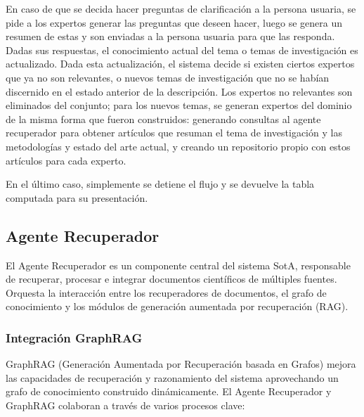 \documentclass[12pt]{article}
\begin{document}
En caso de que se decida hacer preguntas de clarificación a la persona usuaria, se pide a los expertos generar las preguntas que deseen hacer, luego se genera un resumen de estas y son enviadas a la persona usuaria para que las responda. Dadas sus respuestas, el conocimiento actual del tema o temas de investigación es actualizado. Dada esta actualización, el sistema decide si existen ciertos expertos que ya no son relevantes, o nuevos temas de investigación que no se habían discernido en el estado anterior de la descripción. Los expertos no relevantes son eliminados del conjunto; para los nuevos temas, se generan expertos del dominio de la misma forma que fueron construidos: generando consultas al agente recuperador para obtener artículos que resuman el tema de investigación y las metodologías y estado del arte actual, y creando un repositorio propio con estos artículos para cada experto.

En el último caso, simplemente se detiene el flujo y se devuelve la tabla computada para su presentación.

\subsection{Agente Recuperador}
El Agente Recuperador es un componente central del sistema SotA, responsable de recuperar, procesar e integrar documentos científicos de múltiples fuentes. Orquesta la interacción entre los recuperadores de documentos, el grafo de conocimiento y los módulos de generación aumentada por recuperación (RAG).

\subsubsection{Integración GraphRAG}
GraphRAG (Generación Aumentada por Recuperación basada en Grafos) mejora las capacidades de recuperación y razonamiento del sistema aprovechando un grafo de conocimiento construido dinámicamente. El Agente Recuperador y GraphRAG colaboran a través de varios procesos clave:
\end{document}
